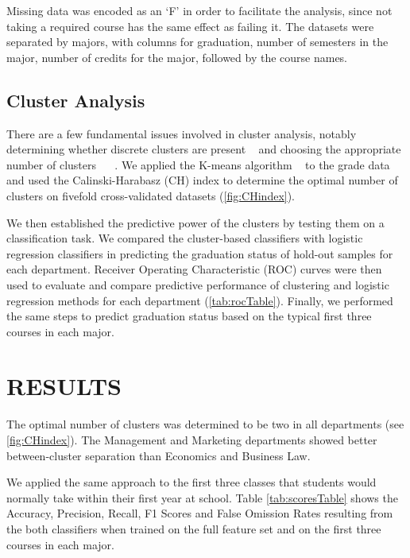 \documentclass{sigchi}
\begin{document}
Missing data was encoded as an ‘F’ in order to facilitate the analysis, since not taking a required course has the same effect as failing it. The datasets were separated by majors, with columns for graduation, number of semesters in the major, number of credits for the major, followed by the course names. 


\subsection{Cluster Analysis}

There are a few fundamental issues involved in cluster analysis, notably determining whether discrete clusters are present ~\cite{knights2014rethinking} and choosing the appropriate number of clusters ~\cite{gordon1999classification} ~\cite{duda2012pattern}. We applied the K-means algorithm ~\cite{macqueen1967some} to the grade data and used the Calinski-Harabasz (CH) index \cite{calinski1974dendrite} to determine the optimal number of clusters on fivefold cross-validated datasets (\ref{fig:CHindex}).

We then established the predictive power of the clusters by testing them on a classification task. We compared the cluster-based classifiers with logistic regression classifiers in predicting the graduation status of hold-out samples for each department. Receiver Operating Characteristic (ROC) curves were then used to evaluate and compare predictive performance of clustering and logistic regression methods for each department (\ref{tab:rocTable}). Finally, we performed the same steps to predict graduation status based on the typical first three courses in each major.


\section{RESULTS}

The optimal number of clusters was determined to be two in all departments (see \ref{fig:CHindex}). The Management and Marketing departments showed better between-cluster separation than Economics and Business Law. 

We applied the same approach to the first three classes that students would normally take within their first year at school. Table \ref{tab:scoresTable} shows the Accuracy, Precision, Recall, F1 Scores and False Omission Rates resulting from the both classifiers when trained on the full feature set and on the first three courses in each major. 
\end{document}
